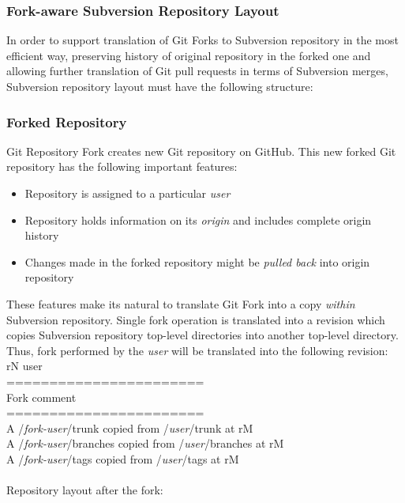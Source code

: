\subsubsection{Fork-aware Subversion Repository Layout}

In order to support translation of Git Forks to Subversion repository in the most efficient way, 
preserving history of original repository in the forked one and allowing further translation of
Git pull requests in terms of Subversion merges, 
Subversion repository layout must have the following structure:

\subsubsection{Forked Repository}
Git Repository Fork creates new Git repository on GitHub. This new forked Git repository has the following 
important features:
\begin{itemize}
\item Repository is assigned to a particular \emph{user}
\item Repository holds information on its \emph{origin} and includes complete origin history
\item Changes made in the forked repository might be \emph{pulled back} into origin repository
\end{itemize}

These features make its natural to translate Git Fork into a copy \emph{within} Subversion repository. Single fork 
operation is translated into a revision which copies Subversion repository top-level directories into another top-level directory. 
Thus, fork performed by the \emph{user} will be translated into the following revision:\\

rN user\\ 
=======================\\
Fork comment             \\
=======================\\
A /\emph{fork-user}/trunk copied from /\emph{user}/trunk at rM\\
A /\emph{fork-user}/branches copied from /\emph{user}/branches at rM\\
A /\emph{fork-user}/tags copied from /\emph{user}/tags at rM\\\\

Repository layout after the fork:\\

